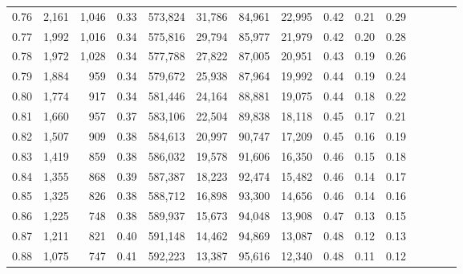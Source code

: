 \begin{tabular}{rrrcrrrrrrrrrrr}
0.76 &   2,161 &  1,046 &                                       0.33 &  573,824 &   31,786 &   84,961 &   22,995 &  0.42 &  0.21 &                         0.29 \\
0.77 &   1,992 &  1,016 &                                       0.34 &  575,816 &   29,794 &   85,977 &   21,979 &  0.42 &  0.20 &                         0.28 \\
0.78 &   1,972 &  1,028 &                                       0.34 &  577,788 &   27,822 &   87,005 &   20,951 &  0.43 &  0.19 &                         0.26 \\
0.79 &   1,884 &    959 &                                       0.34 &  579,672 &   25,938 &   87,964 &   19,992 &  0.44 &  0.19 &                         0.24 \\
0.80 &   1,774 &    917 &                                       0.34 &  581,446 &   24,164 &   88,881 &   19,075 &  0.44 &  0.18 &                         0.22 \\
0.81 &   1,660 &    957 &                                       0.37 &  583,106 &   22,504 &   89,838 &   18,118 &  0.45 &  0.17 &                         0.21 \\
0.82 &   1,507 &    909 &                                       0.38 &  584,613 &   20,997 &   90,747 &   17,209 &  0.45 &  0.16 &                         0.19 \\
0.83 &   1,419 &    859 &                                       0.38 &  586,032 &   19,578 &   91,606 &   16,350 &  0.46 &  0.15 &                         0.18 \\
0.84 &   1,355 &    868 &                                       0.39 &  587,387 &   18,223 &   92,474 &   15,482 &  0.46 &  0.14 &                         0.17 \\
0.85 &   1,325 &    826 &                                       0.38 &  588,712 &   16,898 &   93,300 &   14,656 &  0.46 &  0.14 &                         0.16 \\
0.86 &   1,225 &    748 &                                       0.38 &  589,937 &   15,673 &   94,048 &   13,908 &  0.47 &  0.13 &                         0.15 \\
0.87 &   1,211 &    821 &                                       0.40 &  591,148 &   14,462 &   94,869 &   13,087 &  0.48 &  0.12 &                         0.13 \\
0.88 &   1,075 &    747 &                                       0.41 &  592,223 &   13,387 &   95,616 &   12,340 &  0.48 &  0.11 &                         0.12 \\

\end{tabular}
